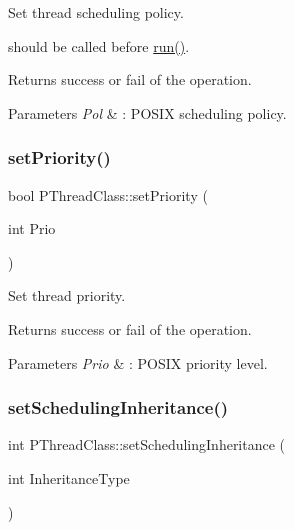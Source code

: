 Set thread scheduling policy.

should be called before \hyperlink{classPThreadClass_a9e60b014b8e8ba6892cc322b6ba183d8}{run()}. \begin{DoxyReturn}{Returns}
success or fail of the operation. 
\end{DoxyReturn}

\begin{DoxyParams}{Parameters}
{\em Pol} & \+: P\+O\+S\+IX scheduling policy. \\
\hline
\end{DoxyParams}
\mbox{\label{classPThreadClass_a8d6247e87165abb43186f1a03261f175}} 
\subsubsection{\texorpdfstring{set\+Priority()}{setPriority()}}
{\footnotesize\ttfamily bool P\+Thread\+Class\+::set\+Priority (\begin{DoxyParamCaption}\item[{int}]{Prio }\end{DoxyParamCaption})}

Set thread priority. \begin{DoxyReturn}{Returns}
success or fail of the operation. 
\end{DoxyReturn}

\begin{DoxyParams}{Parameters}
{\em Prio} & \+: P\+O\+S\+IX priority level. \\
\hline
\end{DoxyParams}
\mbox{\label{classPThreadClass_ad79d5e4fe69d0b77f5c16bf83259c3ad}} 
\subsubsection{\texorpdfstring{set\+Scheduling\+Inheritance()}{setSchedulingInheritance()}}
{\footnotesize\ttfamily int P\+Thread\+Class\+::set\+Scheduling\+Inheritance (\begin{DoxyParamCaption}\item[{int}]{Inheritance\+Type }\end{DoxyParamCaption})\hspace{0.3cm}{\ttfamily [inline]}}

